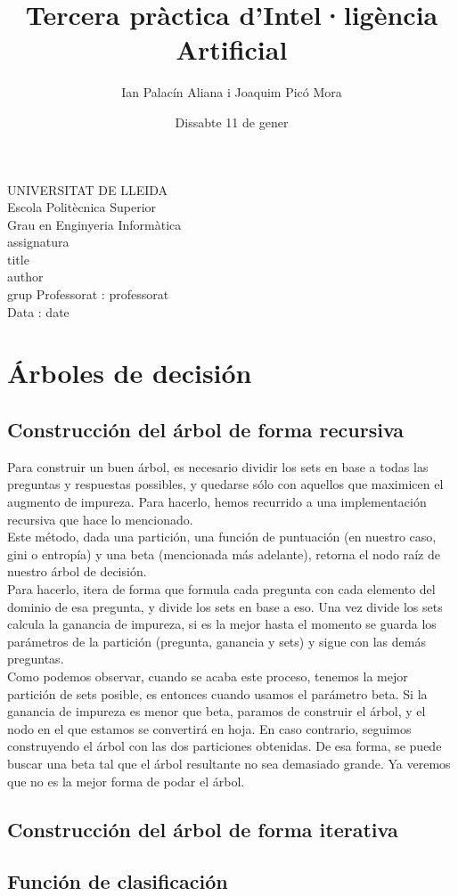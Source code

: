 \documentclass{article}
\title{Tercera pràctica d'Intel·ligència Artificial}
\author{Ian Palacín Aliana i Joaquim Picó Mora}
\date{Dissabte 11 de gener}
\renewcommand{\maketitle}{ %
    \begin{titlepage}
        \raggedright{UNIVERSITAT DE LLEIDA \\
            Escola Politècnica Superior \\
            Grau en Enginyeria Informàtica\\
            \1assignatura\\}
            \vspace{5cm}
            \centering\huge{\5title \\}
            \vspace{3cm}
            \large{\6author} \\
            \normalsize{\3grup}
            \vfill
            Professorat : \4professorat \\
            Data : \7date
\end{titlepage}}
\begin{document}
\maketitle
\thispagestyle{empty}

\newpage
{}
\tableofcontents
\newpage
{}
%
\section{Árboles de decisión}
\subsection{Construcción del árbol de forma recursiva}
Para construir un buen árbol, es necesario
dividir los sets en base a todas las preguntas y respuestas
possibles, y quedarse sólo con aquellos que maximicen el augmento
de impureza. Para hacerlo, hemos recurrido a una implementación
recursiva que hace lo mencionado.\\
Este método, dada una partición, una función de puntuación (en nuestro
caso, gini o entropía) y una beta (mencionada más adelante), retorna
el nodo raíz de nuestro árbol de decisión.\\
Para hacerlo, itera de forma que formula cada pregunta con cada elemento
del dominio de esa pregunta, y divide los sets en base a eso. Una vez divide
los sets calcula la ganancia de impureza, si es la mejor hasta el momento se
guarda los parámetros de la partición (pregunta, ganancia y sets) y sigue 
con las demás preguntas.\\
Como podemos observar, cuando se acaba este proceso, tenemos la mejor
partición de sets posible, es entonces cuando usamos el parámetro beta. Si
la ganancia de impureza es menor que beta, paramos de construir el árbol, y el 
nodo en el que estamos se convertirá en hoja. En
caso contrario, seguimos construyendo el árbol con las dos particiones obtenidas.
De esa forma, se puede buscar una beta tal que el árbol resultante no sea demasiado
grande. Ya veremos que no es la mejor forma de podar el árbol.



\subsection{Construcción del árbol de forma iterativa}
\subsection{Función de clasificación}
\end{document}
